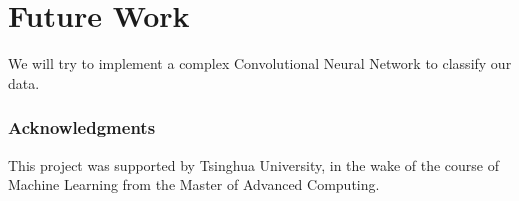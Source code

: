 \documentclass{article} %
\begin{document}
\section{Future Work}
	We will try to implement a complex Convolutional Neural Network to classify our data.

\subsubsection*{Acknowledgments}

	This project was supported by Tsinghua University, in the wake of the course of Machine Learning from the Master of Advanced Computing.

\nocite{*}


\end{document}
